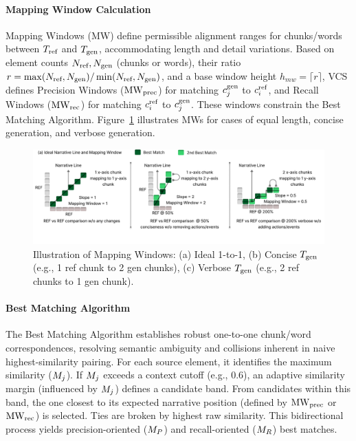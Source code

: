 \paragraph{Mapping Window Calculation} %
\label{sssec:mapping_window_revised} %
Mapping Windows (MW) define permissible alignment ranges for chunks/words between $T_{\text{ref}}$ and $T_{\text{gen}}$, accommodating length and detail variations. Based on element counts $N_{\text{ref}}, N_{\text{gen}}$ (chunks or words), their ratio $r = \max(N_{\text{ref}}, N_{\text{gen}}) / \min(N_{\text{ref}}, N_{\text{gen}})$, and a base window height $h_{mw} = \lceil r \rceil$, VCS defines Precision Windows ($\text{MW}_{\text{prec}}$) for matching $c_{j}^{\text{gen}}$ to $c_{i}^{\text{ref}}$, and Recall Windows ($\text{MW}_{\text{rec}}$) for matching $c_{i}^{\text{ref}}$ to $c_{j}^{\text{gen}}$. These windows constrain the Best Matching Algorithm. Figure~\ref{fig:mapping_windows} illustrates MWs for cases of equal length, concise generation, and verbose generation.
\begin{figure}[ht] %
  \centering
  \includegraphics[width=1\textwidth]{mapping_window.pdf} %
  \caption{Illustration of Mapping Windows: (a) Ideal 1-to-1, (b) Concise $T_{\text{gen}}$ (e.g., 1 ref chunk to 2 gen chunks), (c) Verbose $T_{\text{gen}}$ (e.g., 2 ref chunks to 1 gen chunk).}
  \label{fig:mapping_windows} %
\end{figure}

\paragraph{Best Matching Algorithm} %
\label{sssec:best_matching_revised} %
The Best Matching Algorithm establishes robust one-to-one chunk/word correspondences, resolving semantic ambiguity and collisions inherent in naive highest-similarity pairing. For each source element, it identifies the maximum similarity ($M_j$). If $M_j$ exceeds a context cutoff (e.g., 0.6), an adaptive similarity margin (influenced by $M_j$) defines a candidate band. From candidates within this band, the one closest to its expected narrative position (defined by $\text{MW}_{\text{prec}}$ or $\text{MW}_{\text{rec}}$) is selected. Ties are broken by highest raw similarity. This bidirectional process yields precision-oriented ($M_P$) and recall-oriented ($M_R$) best matches.

